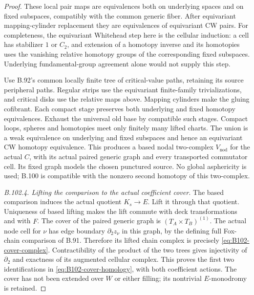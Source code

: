 \begin{proof}
These local pair maps are equivalences both on underlying spaces
and on fixed subspaces, compatibly with the common generic fiber.
After equivariant mapping-cylinder replacement they are equivalences
of equivariant CW pairs. For completeness, the equivariant Whitehead
step here is the cellular induction: a cell has stabilizer $1$ or
$C_2$, and extension of a homotopy inverse and its homotopies uses
the vanishing relative homotopy groups of the corresponding fixed
subspaces. Underlying fundamental-group agreement alone would not
supply this step.

Use B.92's common locally finite tree of critical-value paths,
retaining its source peripheral paths. Regular strips use the
equivariant finite-family trivializations, and critical disks use
the relative maps above. Mapping cylinders make the gluing
cofibrant. Each compact stage preserves both underlying and fixed
homotopy equivalences. Exhaust the universal old base by compatible
such stages. Compact loops, spheres and homotopies meet only
finitely many lifted charts. The union is a weak equivalence on
underlying and fixed subspaces and hence an equivariant CW homotopy
equivalence. This produces a based nodal two-complex $V_{\mathrm{nod}}$
for the actual $C$, with its actual paired generic graph and every
transported commutator cell. Its fixed graph models the chosen
punctured source. No global asphericity is used; B.100 is compatible
with the nonzero second homotopy of this two-complex.

\emph{B.102.4. Lifting the comparison to the actual coefficient cover.}
The based comparison induces the actual quotient $K_s\to E$.
Lift it through that quotient. Uniqueness of based lifting makes
the lift commute with deck transformations and with $F$. The
cover of the paired generic graph is
$(T_A\times T_B)^{(1)}$. The actual node cell for $\nu$ has edge
boundary $\partial_2z_\nu$ in this graph, by the defining full
Fox-chain comparison of B.91. Therefore its lifted chain complex
is precisely \eqref{eq:B102-cover-complex}. Contractibility of the
product of the two trees gives injectivity of $\partial_2$ and
exactness of its augmented cellular complex. This proves the
first two identifications in \eqref{eq:B102-cover-homology}, with
both coefficient actions. The cover has not been extended over
$W$ or either filling; its nontrivial $E$-monodromy is retained.


\end{proof}
